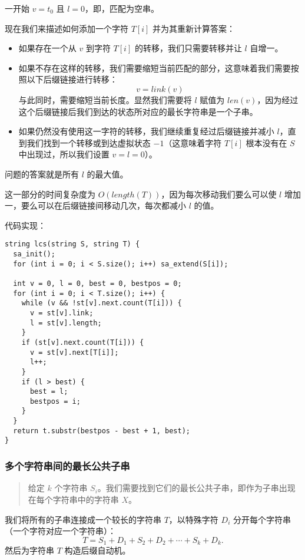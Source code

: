 一开始 \(v=t_0\) 且 \(l=0\)，即，匹配为空串。

现在我们来描述如何添加一个字符 \(T[i]\) 并为其重新计算答案：

\begin{itemize}
\item
  如果存在一个从 \(v\) 到字符 \(T[i]\) 的转移，我们只需要转移并让 \(l\)
  自增一。
\item
  如果不存在这样的转移，我们需要缩短当前匹配的部分，这意味着我们需要按照以下后缀链接进行转移：
\[
v=link(v)
\]
与此同时，需要缩短当前长度。显然我们需要将 \(l\) 赋值为
\(len(v)\)，因为经过这个后缀链接后我们到达的状态所对应的最长字符串是一个子串。
\item
  如果仍然没有使用这一字符的转移，我们继续重复经过后缀链接并减小
  \(l\)，直到我们找到一个转移或到达虚拟状态 \(-1\)（这意味着字符
  \(T[i]\) 根本没有在 \(S\) 中出现过，所以我们设置 \(v=l=0\)）。
\end{itemize}

问题的答案就是所有 \(l\) 的最大值。

这一部分的时间复杂度为 \(O(length(T))\)，因为每次移动我们要么可以使
\(l\) 增加一，要么可以在后缀链接间移动几次，每次都减小 \(l\) 的值。

代码实现：

\begin{verbatim}
string lcs(string S, string T) {
  sa_init();
  for (int i = 0; i < S.size(); i++) sa_extend(S[i]);

  int v = 0, l = 0, best = 0, bestpos = 0;
  for (int i = 0; i < T.size(); i++) {
    while (v && !st[v].next.count(T[i])) {
      v = st[v].link;
      l = st[v].length;
    }
    if (st[v].next.count(T[i])) {
      v = st[v].next[T[i]];
      l++;
    }
    if (l > best) {
      best = l;
      bestpos = i;
    }
  }
  return t.substr(bestpos - best + 1, best);
}
\end{verbatim}

\subsubsection{多个字符串间的最长公共子串}

\begin{quote}
给定 \(k\) 个字符串
\(S_i\)。我们需要找到它们的最长公共子串，即作为子串出现在每个字符串中的字符串
\(X\)。
\end{quote}

我们将所有的子串连接成一个较长的字符串 \(T\)，以特殊字符 \(D_i\)
分开每个字符串（一个字符对应一个字符串）：
\[
T=S_1+D_1+S_2+D_2+\cdots+S_k+D_k.
\]
然后为字符串 \(T\) 构造后缀自动机。

